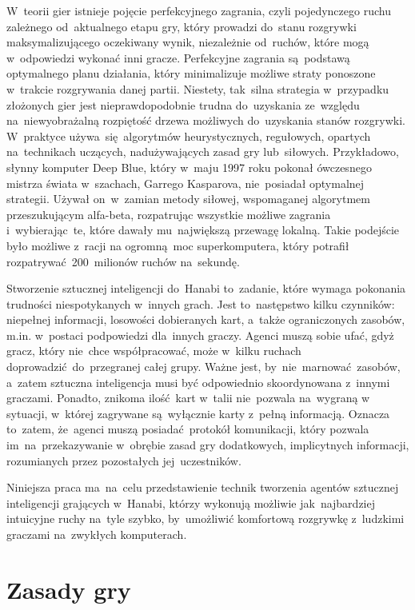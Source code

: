 \documentclass[declaration,shortabstract,inz]{iithesis}
\begin{document}
W~teorii gier istnieje pojęcie perfekcyjnego zagrania, czyli pojedynczego ruchu zależnego od~aktualnego etapu gry, który prowadzi do~stanu rozgrywki maksymalizującego oczekiwany wynik, niezależnie od~ruchów, które mogą w~odpowiedzi wykonać inni gracze. Perfekcyjne zagrania są~podstawą optymalnego planu działania, który minimalizuje możliwe straty ponoszone w~trakcie rozgrywania danej partii. Niestety, tak~silna strategia w~przypadku złożonych gier jest nieprawdopodobnie trudna do~uzyskania ze~względu na~niewyobrażalną rozpiętość drzewa możliwych do~uzyskania stanów rozgrywki. W~praktyce używa~się algorytmów heurystycznych, regułowych, opartych na~technikach uczących, nadużywających zasad gry lub~siłowych. Przykładowo, słynny komputer Deep Blue, który w~maju 1997 roku pokonał ówczesnego mistrza świata w~szachach, Garrego Kasparova, nie~posiadał optymalnej strategii. Używał on~w~zamian metody siłowej, wspomaganej algorytmem przeszukującym alfa-beta, rozpatrując wszystkie możliwe zagrania i~wybierając~te, które dawały mu~największą przewagę lokalną. Takie podejście było możliwe z~racji na ogromną moc superkomputera, który potrafił rozpatrywać 200~milionów ruchów na~sekundę.

Stworzenie sztucznej inteligencji do~Hanabi to~zadanie, które wymaga pokonania trudności niespotykanych w~innych grach. Jest to~następstwo kilku czynników: niepełnej informacji, losowości dobieranych kart, a~także ograniczonych zasobów, m.in. w~postaci podpowiedzi dla~innych graczy. Agenci muszą sobie ufać, gdyż gracz, który nie~chce współpracować, może w~kilku ruchach doprowadzić do~przegranej całej grupy. Ważne jest, by~nie~marnować zasobów, a~zatem sztuczna inteligencja musi być odpowiednio skoordynowana z~innymi graczami. Ponadto, znikoma ilość kart w~talii nie~pozwala na~wygraną w sytuacji, w~której zagrywane są~wyłącznie karty z~pełną informacją. Oznacza to~zatem, że~agenci muszą posiadać protokół komunikacji, który pozwala im~na~przekazywanie w~obrębie zasad gry dodatkowych, implicytnych informacji, rozumianych przez pozostałych jej~uczestników.

Niniejsza praca ma~na~celu przedstawienie technik tworzenia agentów sztucznej inteligencji grających w~Hanabi, którzy wykonują możliwie jak~najbardziej intuicyjne ruchy na~tyle szybko, by~umożliwić komfortową rozgrywkę z~ludzkimi graczami na~zwykłych komputerach.

\chapter{Zasady gry}




\end{document}
